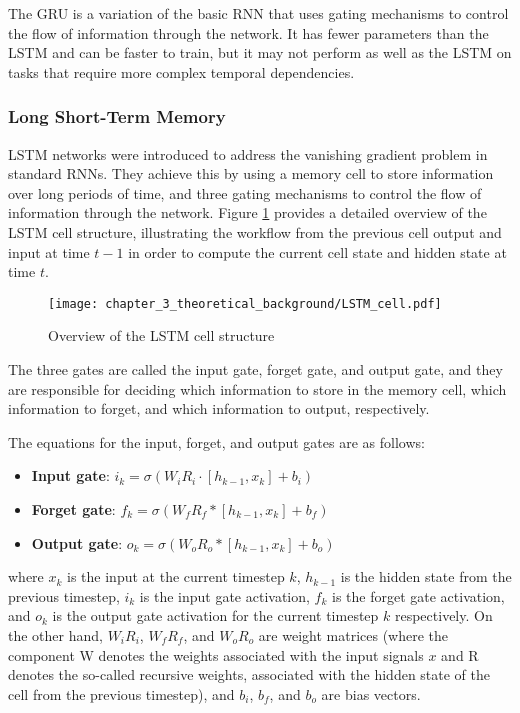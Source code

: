 The GRU is a variation of the basic RNN that uses gating mechanisms to control the flow of information through the network. It has fewer parameters than the LSTM and can be faster to train, but it may not perform as well as the LSTM on tasks that require more complex temporal dependencies.

\subsubsection{Long Short-Term Memory}
\label{subsubsec:3_LSTMs}

LSTM networks were introduced to address the vanishing gradient problem in standard \acp{RNN}. They achieve this by using a memory cell to store information over long periods of time, and three gating mechanisms to control the flow of information through the network. Figure \ref{fig:chapter_3_theoretical_background/LSTM} provides a detailed overview of the LSTM cell structure, illustrating the workflow from the previous cell output and input at time $t-1$ in order to compute the current cell state and hidden state at time $t$.

\begin{figure}[h]
	\centering
	\texttt{[image: chapter\_3\_theoretical\_background/LSTM\_cell.pdf]}
	\caption{Overview of the LSTM cell structure}
	\label{fig:chapter_3_theoretical_background/LSTM}
\end{figure}

The three gates are called the input gate, forget gate, and output gate, and they are responsible for deciding which information to store in the memory cell, which information to forget, and which information to output, respectively.

The equations for the input, forget, and output gates are as follows:

\begin{itemize}
	\item \textbf{Input gate}: $i_k = \sigma(W_i R_i \cdot [h_{k-1}, x_k] + b_i)$
	\item \textbf{Forget gate}: $f_k = \sigma(W_f R_f * [h_{k-1}, x_k] + b_f)$
	\item \textbf{Output gate}: $o_k = \sigma(W_o R_o * [h_{k-1}, x_k] + b_o)$
\end{itemize}

where $x_k$ is the input at the current timestep $k$, $h_{k-1}$ is the hidden state from the previous timestep, $i_k$ is the input gate activation, $f_k$ is the forget gate activation, and $o_k$ is the output gate activation for the current timestep $k$ respectively. On the other hand, $W_i R_i$, $W_f R_f$, and $W_o R_o$ are weight matrices (where the component W denotes the weights associated with the input signals $x$ and R denotes the so-called recursive weights, associated with the hidden state of the cell from the previous timestep), and $b_i$, $b_f$, and $b_o$ are bias vectors.

